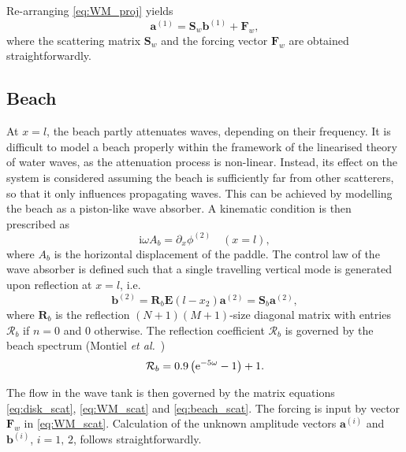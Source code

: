 \documentclass[12pt,a4paper]{article}
\def\ci{{\mathrm i}}
\renewcommand{\exp}{{\rm e}}
\newcommand{\ie}{i.e.\ }
\newcommand{\etal}{\textit{et al.}\ }
\newcommand{\vp}{{\phi}}
\begin{document}
Re-arranging \eqref{eq:WM_proj} yields 
\begin{equation}
  \label{eq:WM_scat}
  \mathbf{a}^{(1)} = \mathbf{S}_w\mathbf{b}^{(1)} + \mathbf{F}_w,
\end{equation}
where the scattering matrix $\mathbf{S}_w$ and the forcing vector $\mathbf{F}_w$ are obtained 
straightforwardly.


\subsection{Beach}

At $x=l$, the beach partly attenuates waves, depending on their frequency. It is difficult to model a beach 
properly within the framework of the linearised theory of water waves, as the attenuation process is 
non-linear. Instead, its effect on the system is considered assuming the beach is sufficiently far from 
other scatterers, so that it only influences propagating waves. This can be achieved by modelling the beach 
as a piston-like wave absorber. A kinematic condition is then prescribed as
\begin{equation}
  \label{eq:beach}
  \ci \omega A_b = \partial_x \vp^{(2)} \quad (x=l),
\end{equation}
where $A_b$ is the horizontal displacement of the paddle. The control law of the wave absorber is defined 
such that a single travelling vertical mode is generated upon reflection at $x=l$, \ie
\begin{equation}
  \label{eq:beach_scat}
  \mathbf{b}^{(2)} = \mathbf{R}_b\mathbf{E}(l-x_2)\mathbf{a}^{(2)} = \mathbf{S}_b\mathbf{a}^{(2)},
\end{equation}
where $\mathbf{R}_b$ is the reflection $(N+1)(M+1)$-size diagonal matrix with entries $\mathcal{R}_b$ if 
$n=0$ and $0$ otherwise. The reflection coefficient $\mathcal{R}_b$ is governed by the beach spectrum 
(Montiel \etal \cite{Montiel_etal12})
\begin{equation}
  \mathcal{R}_b = 0.9\left(\exp^{-5\omega} -1\right) + 1.
\end{equation}

The flow in the wave tank is then governed by the matrix equations \eqref{eq:disk_scat}, \eqref{eq:WM_scat} 
and \eqref{eq:beach_scat}. The forcing is input by vector $\mathbf{F}_w$ in \eqref{eq:WM_scat}. Calculation 
of the unknown amplitude vectors $\mathbf{a}^{(i)}$ and $\mathbf{b}^{(i)}$, $i=1,\,2$, follows 
straightforwardly.



% 


%
\end{document}
